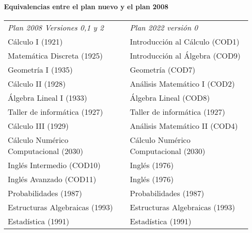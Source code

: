 \documentclass[a4paper, 12pt]{article}
\begin{document}
\paragraph{Equivalencias entre el plan nuevo y el plan 2008} \fontsize{11pt}{11pt}\selectfont
\begin{center}
\begin{tabularx}{1\textwidth}{|>{\raggedright\arraybackslash}X |
>{\raggedright\arraybackslash}X |}
\hline
  \rowcolor[gray]{.9}
  \multicolumn{2}{|c|}{\textbf{Equivalencias}}\\\hline

   \emph{Plan 2008 Versiones 0,1 y 2 }  &  \emph{
Plan 2022 versión 0}   \\
\hline


Cálculo I       (1921)               &Introducción al Cálculo    (COD1)      \\   \hline

Matemática Discreta   (1925)          &Introducción al Álgebra (COD9) \\ \hline

Geometría I        (1935)             & Geometría  (COD7)   \\ \hline

Cálculo II         (1928)             & Análisis Matemático I (COD2)  \\ \hline

Álgebra Lineal I      (1933)          & Álgebra Lineal   (COD8)  \\ \hline

Taller de informática  (1927)        &Taller de informática (1927) \\ \hline

Cálculo III        (1929)             & Análisis Matemático II (COD4)  \\ \hline

Cálculo Numérico  Computacional (2030) &Cálculo Numérico Computacional (2030) 
\\ \hline

Inglés    Intermedio   (COD10)            &    Inglés (1976) 
\\ \hline
Inglés     Avanzado  (COD11)            &    Inglés (1976) 
\\ \hline
Probabilidades  (1987)      &Probabilidades    (1987)      \\ \hline

Estructuras Algebraicas (1993)    & Estructuras Algebraicas (1993)  \\ \hline

Estadística     (1991)    &Estadística     (1991)        \\ \hline



\end{tabularx}
\end{center}
\end{document}
